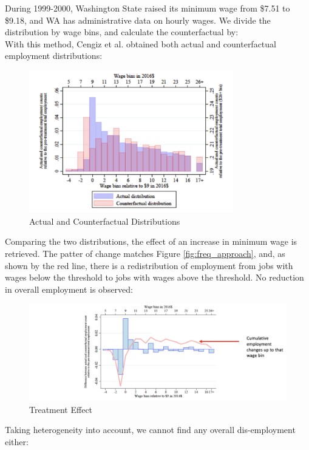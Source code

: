         During 1999-2000, Washington State raised its minimum wage from \$7.51 to \$9.18, and WA has administrative data on hourly wages. We divide the distribution by wage bins, and calculate the counterfactual by:
        $$$$
        With this method, Cengiz et al. obtained both actual and counterfactual employment distributions:
        \begin{figure}[H]
            \centering
            \includegraphics[width=3.5in]{images/ch2/Freq_approach_3.png}
            \caption{Actual and Counterfactual Distributions}
        \end{figure}
        Comparing the two distributions, the effect of an increase in minimum wage is retrieved. The patter of change matches Figure \ref{fig:freq_approach}, and, as shown by the red line, there is a redistribution of employment from jobs with wages below the threshold to jobs with wages above the threshold. No reduction in overall employment is observed:
        \begin{figure}[H]
            \centering
            \includegraphics[width=6.5in]{images/ch2/Freq_approach_4.png}
            \caption{Treatment Effect}
        \end{figure}
        Taking heterogeneity into account, we cannot find any overall dis-employment either:
